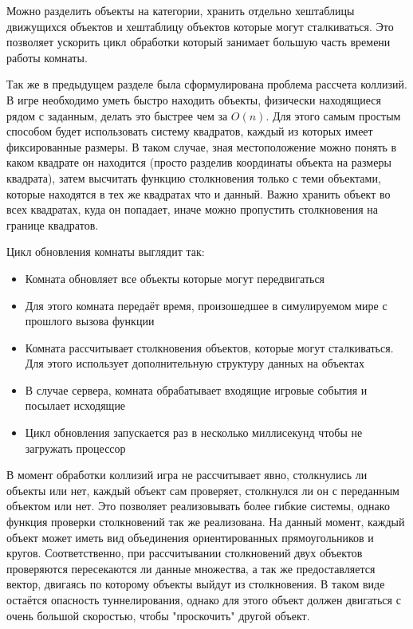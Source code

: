 \documentclass[a4paper,14pt, openany]{book}
\begin{document}
Можно разделить объекты на категории, хранить отдельно хештаблицы движущихся объектов и хештаблицу объектов которые могут сталкиваться. Это позволяет ускорить цикл обработки который занимает большую часть времени работы комнаты.

Так же в предыдущем разделе была сформулирована проблема рассчета коллизий. В игре необходимо уметь быстро находить объекты, физически находящиеся рядом с заданным, делать это быстрее чем за $O(n)$. Для этого самым простым способом будет использовать систему квадратов, каждый из которых имеет фиксированные размеры. В таком случае, зная местоположение можно понять в каком квадрате он находится (просто разделив координаты объекта на размеры квадрата), затем высчитать функцию столкновения только с теми объектами, которые находятся в тех же квадратах что и данный. Важно хранить объект во всех квадратах, куда он попадает, иначе можно пропустить столкновения на границе квадратов.

Цикл обновления комнаты выглядит так:
\begin {itemize}
  \item Комната обновляет все объекты которые могут передвигаться
  \item Для этого комната передаёт время, произошедшее в симулируемом мире с прошлого вызова функции
  \item Комната рассчитывает столкновения объектов, которые могут сталкиваться. Для этого использует дополнительную структуру данных на объектах
  \item В случае сервера, комната обрабатывает входящие игровые события и посылает исходящие 
  \item Цикл обновления запускается раз в несколько миллисекунд чтобы не загружать процессор
\end {itemize}

В момент обработки коллизий игра не рассчитывает явно, столкнулись ли объекты или нет, каждый объект сам проверяет, столкнулся ли он с переданным объектом или нет. Это позволяет реализовывать более гибкие системы, однако функция проверки столкновений так же реализована. На данный момент, каждый объект может иметь вид объединения ориентированных прямоугольников и кругов. Соответственно, при рассчитывании столкновений двух объектов проверяются пересекаются ли данные множества, а так же предоставляется вектор, двигаясь по которому объекты выйдут из столкновения. В таком виде остаётся опасность туннелирования, однако для этого объект должен двигаться с очень большой скоростью, чтобы "проскочить" другой объект.
\end{document}
